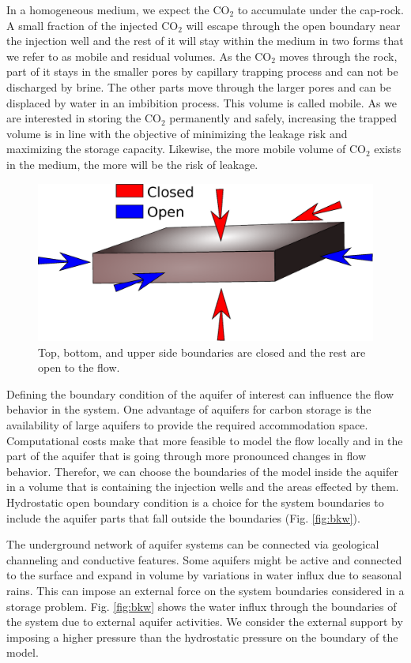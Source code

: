 In a homogeneous medium, we expect the $\mbox{CO}_2$ to accumulate under the
cap-rock. A small fraction of the injected $\mbox{CO}_2$ will escape through the
open boundary near the injection well and the rest of it will stay within the
medium in two forms that we refer to as  mobile and residual volumes. As
the $\mbox{CO}_2$ moves through the rock, part of it stays in the smaller pores
by capillary trapping process and can not be discharged by brine. The other
parts move through the larger pores and can be displaced by water in an
imbibition process. This volume is called mobile. As we are interested in
storing the $\mbox{CO}_2$ permanently and safely, increasing the trapped volume
is in line with the objective of minimizing the leakage risk and maximizing the
storage capacity. Likewise, the more mobile volume of $\mbox{CO}_2$ exists in
the medium, the more will be the risk of leakage. 

\begin{figure}
 \centering{}
 \includegraphics[width=0.6\linewidth]{./figurer/boundaries.eps}
 \caption{Top, bottom, and upper side boundaries are closed and the rest
are open to the flow.}
 \label{fig:BDRY}
\end{figure}

Defining the boundary condition of the aquifer of interest can influence the
flow behavior in the system. One advantage of aquifers for carbon storage is the
availability of large aquifers to provide the required accommodation space.
Computational costs make that more feasible to model the flow locally and in the
part of the aquifer that is going through more pronounced changes in flow
behavior. Therefor, we can choose the boundaries of the model inside the aquifer
in a volume that is containing the injection wells and the areas effected by
them. Hydrostatic open boundary condition is a choice for the system boundaries
to include the aquifer parts that fall outside the boundaries (Fig.
\ref{fig:bkw}).

The underground network of aquifer systems can be connected via geological
channeling and conductive features. Some aquifers might be active and connected
to the surface and expand in volume by variations in water influx due to 
seasonal rains. This can impose an external force on the system boundaries
considered in a storage problem. Fig. \ref{fig:bkw} shows the water influx
through the boundaries of the system due to external aquifer activities. We
consider the external support by imposing a higher pressure than the hydrostatic
pressure on the boundary of the model.

